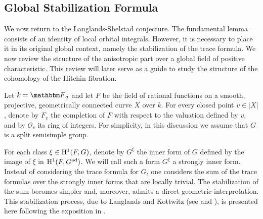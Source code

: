 \documentclass[12pt,english]{smfart}
\numberwithin{equation}{subsection}
\theoremstyle{remark}
\newcommand\calO{{\mathscr O}}
\newcommand\FF{{\mathbbm F}}
\newcommand\rmH{{\rm H}}
\begin{document}
\subsection{Global Stabilization Formula}\label{Formule globale de stabilisation}

We now return to the Langlands-Shelstad conjecture. The fundamental lemma consists of an identity of local orbital integrals. However, it is necessary to place it in its original global context, namely the stabilization of the trace formula. We now review the structure of the anisotropic part over a global field of positive characteristic. This review will later serve as a guide to study the structure of the cohomology of the Hitchin fibration.

Let $k=\FF_q$ and let $F$ be the field of rational functions on a smooth, projective, geometrically connected curve $X$ over $k$. For every closed point $v\in |X|$, denote by $F_v$ the completion of $F$ with respect to the valuation defined by $v$, and by $\calO_v$ its ring of integers. For simplicity, in this discussion we assume that $G$ is a split semisimple group.

For each class $\xi\in\rmH^1(F,G)$, denote by $G^\xi$ the inner form of $G$ defined by the image of $\xi$ in $\rmH^1(F,G^{\rm ad})$. We will call such a form $G^\xi$ a strongly inner form. Instead of considering the trace formula for $G$, one considers the sum of the trace formulas over the strongly inner forms that are locally trivial. The stabilization of the sum becomes simpler and, moreover, admits a direct geometric interpretation. This stabilization process, due to Langlands and Kottwitz (see \cite{Langlands} and \cite{K-EST}), is presented here following the exposition in \cite{N-ICM}.
\end{document}
